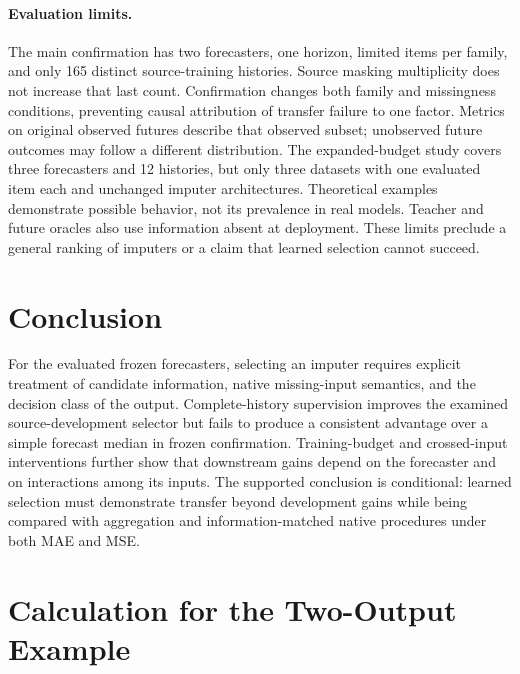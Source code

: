\documentclass{article}
\begin{document}
\paragraph{Evaluation limits.}
The main confirmation has two forecasters, one horizon, limited items per family, and only 165 distinct source-training histories. Source masking multiplicity does not increase that last count. Confirmation changes both family and missingness conditions, preventing causal attribution of transfer failure to one factor. Metrics on original observed futures describe that observed subset; unobserved future outcomes may follow a different distribution. The expanded-budget study covers three forecasters and 12 histories, but only three datasets with one evaluated item each and unchanged imputer architectures. Theoretical examples demonstrate possible behavior, not its prevalence in real models. Teacher and future oracles also use information absent at deployment. These limits preclude a general ranking of imputers or a claim that learned selection cannot succeed.

\section{Conclusion}

For the evaluated frozen forecasters, selecting an imputer requires explicit treatment of candidate information, native missing-input semantics, and the decision class of the output. Complete-history supervision improves the examined source-development selector but fails to produce a consistent advantage over a simple forecast median in frozen confirmation. Training-budget and crossed-input interventions further show that downstream gains depend on the forecaster and on interactions among its inputs. The supported conclusion is conditional: learned selection must demonstrate transfer beyond development gains while being compared with aggregation and information-matched native procedures under both MAE and MSE.




\appendix
\section{Calculation for the Two-Output Example}
\label{app:example}
\end{document}
